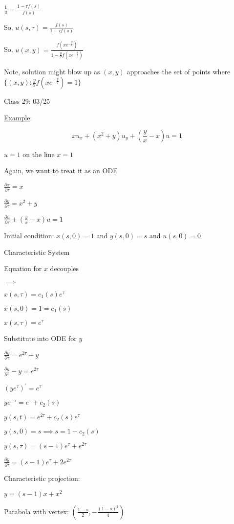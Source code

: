 \documentclass{article}
\theoremstyle{definition}
\begin{document}
\(\frac{1}{u} = \frac{1-\tau f(s)}{f(s)}\)

So, \(u(s,\tau)=\frac{f(s)}{1-\tau f(s)}\) 

So, \(u(x,y) = \frac{f(x e^{- \frac{y}{2}})}{1 - \frac{y}{2} f(x e^{-\frac{y}{2}})}\) 

Note, solution might blow up as \((x,y)\) approaches the set of points where \(\{ (x,y): \frac{y}{2}f(x e^{-\frac{y}{2}}) = 1 \} \) 

\hrulefill

Class 29: 03/25

\underline{Example}:

\[
    x u_x + (x^2 + y)u_y + (\frac{y}{x} - x)u = 1
\]

\(u = 1\) on the line \(x = 1\)

Again, we want to treat it as an ODE

\(\frac{\partial x}{\partial \tau} = x\)

\(\frac{\partial y}{\partial \tau} = x^2 + y\)

\(\frac{\partial u}{\partial \tau} + \left( \frac{y}{x} - x \right) u = 1 \) 

Initial condition: \(x(s,0) = 1\) and \(y(s,0) = s\) and \(u(s,0) = 0\) 

Characteristic System

Equation for \(x\) decouples

\(\implies \)

\(x(s,\tau) = c_{1} (s) e^\tau \) 

\(x(s,0)=1 = c_1(s)\)

\(x(s,\tau) = e^\tau\) 

Substitute into ODE for \(y\) 

\(\frac{\partial y}{\partial \tau} = e^{2\tau} + y\)

\(\frac{\partial y}{\partial \tau} - y = e^{2\tau}\)

\((y e^{\tau})^{\prime} = e^\tau\)

\(y e^{-\tau} = e^\tau + c_2(s)\) 

\(y(s,t) = e^{2\tau} + c_2(s)e^\tau\)

\(y(s,0)=s \implies s = 1+c_2(s)\)

\(y(s,\tau) = (s-1)e^{\tau} + e^{2\tau}\) 

\(\frac{\partial y}{\partial \tau} = (s-1)e^\tau + 2 e^{2\tau}\) 

Characteristic projection:

\(y = (s-1)x + x^2\)  

Parabola with vertex: \(\left( \frac{1-s}{2}, - \frac{(1-s)^2}{4} \right) \) 
\end{document}

